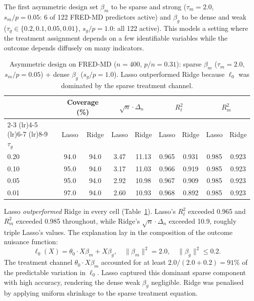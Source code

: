 \documentclass[a4paper,10.5pt]{article}
\begin{document}
The first asymmetric design set $\beta_m$ to be sparse and strong ($\tau_m = 2.0$, $s_m/p = 0.05$: 6 of 122 FRED-MD predictors active) and $\beta_g$ to be dense and weak ($\tau_g \in \{0.2, 0.1, 0.05, 0.01\}$, $s_g/p = 1.0$: all 122 active). This models a setting where the treatment assignment depends on a few identifiable variables while the outcome depends diffusely on many indicators.

\begin{table}[H]
\centering
\small
\caption{Asymmetric design on FRED-MD ($n = 400$, $p/n = 0.31$): sparse $\beta_m$ ($\tau_m = 2.0$, $s_m/p = 0.05$) + dense $\beta_g$ ($s_g/p = 1.0$). Lasso outperformed Ridge because $\ell_0$ was dominated by the sparse treatment channel.}
\label{tab:asym_fwd}
\begin{tabular}{lcccccccc}
\toprule
& \multicolumn{2}{c}{Coverage (\%)} & \multicolumn{2}{c}{$\sqrt{n}\cdot\Delta_n$} & \multicolumn{2}{c}{$R^2_\ell$} & \multicolumn{2}{c}{$R^2_m$} \\
\cmidrule(lr){2-3} \cmidrule(lr){4-5} \cmidrule(lr){6-7} \cmidrule(lr){8-9}
$\tau_g$ & Lasso & Ridge & Lasso & Ridge & Lasso & Ridge & Lasso & Ridge \\
\midrule
0.20 & 94.0 & 94.0 & 3.47 & 11.13 & 0.965 & 0.931 & 0.985 & 0.923 \\
0.10 & 95.0 & 94.0 & 3.17 & 11.03 & 0.966 & 0.919 & 0.985 & 0.923 \\
0.05 & 95.0 & 94.0 & 2.92 & 10.98 & 0.967 & 0.909 & 0.985 & 0.923 \\
0.01 & 97.0 & 94.0 & 2.60 & 10.93 & 0.968 & 0.892 & 0.985 & 0.923 \\
\bottomrule
\end{tabular}
\end{table}

Lasso \emph{outperformed} Ridge in every cell (Table~\ref{tab:asym_fwd}). Lasso's $R^2_\ell$ exceeded 0.965 and $R^2_m$ exceeded 0.985 throughout, while Ridge's $\sqrt{n}\cdot\Delta_n$ exceeded 10.9, roughly triple Lasso's values. The explanation lay in the composition of the outcome nuisance function:
\[
\ell_0(X) = \theta_0 \cdot X\beta_m + X\beta_g, \quad \|\beta_m\|^2 = 2.0, \quad \|\beta_g\|^2 \leq 0.2.
\]
The treatment channel $\theta_0 \cdot X\beta_m$ accounted for at least $2.0/(2.0 + 0.2) = 91\%$ of the predictable variation in $\ell_0$. Lasso captured this dominant sparse component with high accuracy, rendering the dense weak $\beta_g$ negligible. Ridge was penalised by applying uniform shrinkage to the sparse treatment equation.
\end{document}
